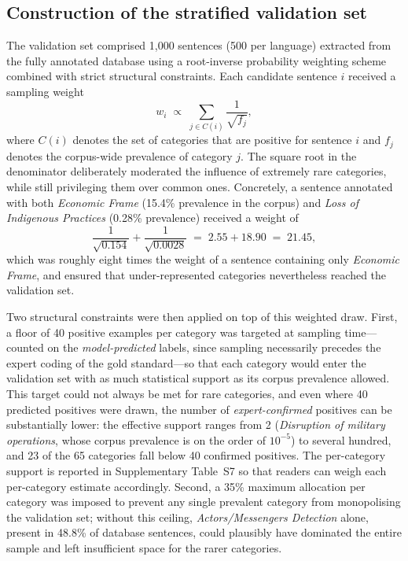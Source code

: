 \documentclass[12pt]{article}
\renewcommand\_{\texttt{\detokenize{_}\allowbreak}}
\begin{document}
\subsection{Construction of the stratified validation set}

The validation set comprised 1,000 sentences (500 per language) extracted from the fully annotated database using a root-inverse probability weighting scheme combined with strict structural constraints. Each candidate sentence $i$ received a sampling weight
\begin{equation}
    w_i \;\propto\; \sum_{j \in C(i)} \frac{1}{\sqrt{f_j}},
\end{equation}
where $C(i)$ denotes the set of categories that are positive for sentence $i$ and $f_j$ denotes the corpus-wide prevalence of category $j$. The square root in the denominator deliberately moderated the influence of extremely rare categories, while still privileging them over common ones. Concretely, a sentence annotated with both \textit{Economic Frame} (15.4\% prevalence in the corpus) and \textit{Loss of Indigenous Practices} (0.28\% prevalence) received a weight of
\begin{equation*}
    \frac{1}{\sqrt{0.154}} + \frac{1}{\sqrt{0.0028}} \;=\; 2.55 + 18.90 \;=\; 21.45,
\end{equation*}
which was roughly eight times the weight of a sentence containing only \textit{Economic Frame}, and ensured that under-represented categories nevertheless reached the validation set.

Two structural constraints were then applied on top of this weighted draw. First, a floor of 40 positive examples per category was targeted at sampling time---counted on the \emph{model-predicted} labels, since sampling necessarily precedes the expert coding of the gold standard---so that each category would enter the validation set with as much statistical support as its corpus prevalence allowed. This target could not always be met for rare categories, and even where 40 predicted positives were drawn, the number of \emph{expert-confirmed} positives can be substantially lower: the effective support ranges from 2 (\textit{Disruption of military operations}, whose corpus prevalence is on the order of $10^{-5}$) to several hundred, and 23 of the 65 categories fall below 40 confirmed positives. The per-category support is reported in Supplementary Table~S7 so that readers can weigh each per-category estimate accordingly. Second, a 35\% maximum allocation per category was imposed to prevent any single prevalent category from monopolising the validation set; without this ceiling, \textit{Actors/Messengers Detection} alone, present in 48.8\% of database sentences, could plausibly have dominated the entire sample and left insufficient space for the rarer categories.
\end{document}
